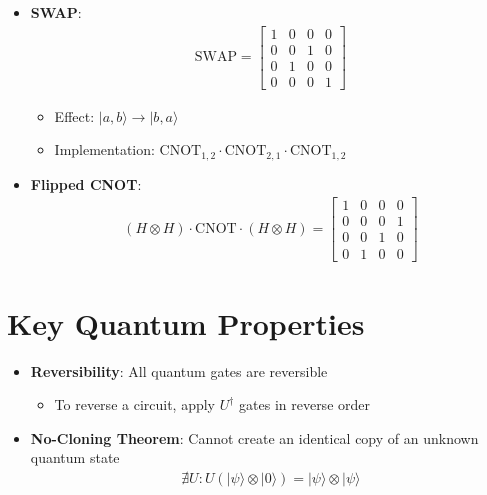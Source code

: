 \begin{multicols}{3}
\begin{itemize}[leftmargin=*,nosep,topsep=0pt]
    \item \textbf{SWAP}:
    \begin{align*}
        \text{SWAP} = \begin{bmatrix}
            1 & 0 & 0 & 0 \\
            0 & 0 & 1 & 0 \\
            0 & 1 & 0 & 0 \\
            0 & 0 & 0 & 1
        \end{bmatrix}
    \end{align*}
    \begin{itemize}[nosep]
        \item Effect: $|a,b\rangle \to |b,a\rangle$
        \item Implementation: $\text{CNOT}_{1,2} \cdot \text{CNOT}_{2,1} \cdot \text{CNOT}_{1,2}$
    \end{itemize}

    \item \textbf{Flipped CNOT}:
    \begin{align*}
        (H \otimes H) \cdot \text{CNOT} \cdot (H \otimes H) = \begin{bmatrix}
            1 & 0 & 0 & 0 \\
            0 & 0 & 0 & 1 \\
            0 & 0 & 1 & 0 \\
            0 & 1 & 0 & 0
        \end{bmatrix}
    \end{align*}
\end{itemize}

\section*{Key Quantum Properties}
\begin{itemize}[leftmargin=*,nosep,topsep=0pt]
    \item \textbf{Reversibility}: All quantum gates are reversible
    \begin{itemize}[nosep]
        \item To reverse a circuit, apply $U^\dagger$ gates in reverse order
    \end{itemize}

    \item \textbf{No-Cloning Theorem}: Cannot create an identical copy of an unknown quantum state
    \begin{align*}
        \nexists U: U(|\psi\rangle \otimes |0\rangle) = |\psi\rangle \otimes |\psi\rangle
    \end{align*}


\end{itemize}
\end{multicols}

